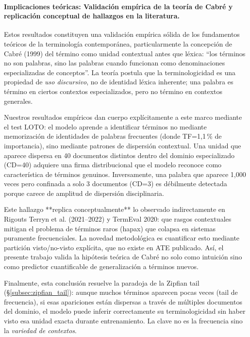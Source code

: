 \paragraph{Implicaciones teóricas: Validación empírica de la teoría de Cabré y replicación conceptual de hallazgos en la literatura.}

Estos resultados constituyen una validación empírica sólida de los fundamentos teóricos de la terminología contemporánea, particularmente la concepción de Cabré (1999) del término como unidad contextual antes que léxica: ``los términos no son palabras, sino las palabras cuando funcionan como denominaciones especializadas de conceptos''. La teoría postula que la terminologicidad es una propiedad de \emph{uso discursivo}, no de identidad léxica inherente; una palabra es término en ciertos contextos especializados, pero no término en contextos generales.

Nuestros resultados empíricos dan cuerpo explícitamente a este marco mediante el test LOTO: el modelo aprende a identificar términos no mediante memorización de identidades de palabras frecuentes (donde TF=1{,}1\,\% de importancia), sino mediante patrones de dispersión contextual. Una unidad que aparece dispersa en 40 documentos distintos dentro del dominio especializado (CD=40) adquiere una firma distribucional que el modelo reconoce como característica de términos genuinos. Inversamente, una palabra que aparece 1{,}000 veces pero confinada a solo 3 documentos (CD=3) es débilmente detectada porque carece de amplitud de dispersión disciplinaria.

Este hallazgo **replica conceptualmente** lo observado indirectamente en Rigouts Terryn et al. (2021--2022) y TermEval 2020: que rasgos contextuales mitigan el problema de términos raros (hapax) que colapsa en sistemas puramente frecuenciales. La novedad metodológica es cuantificar esto mediante partición visto/no-visto explícita, que no existe en ATE publicado. Así, el presente trabajo valida la hipótesis teórica de Cabré no solo como intuición sino como predictor cuantificable de generalización a términos nuevos.

Finalmente, esta conclusión resuelve la paradoja de la Zipfian tail (§\ref{subsec:zipfian_tail}): aunque muchos términos aparecen pocas veces (tail de frecuencia), si esas apariciones están dispersas a través de múltiples documentos del dominio, el modelo puede inferir correctamente su terminologicidad sin haber visto esa unidad exacta durante entrenamiento. La clave no es la frecuencia sino la \emph{variedad de contextos}.

